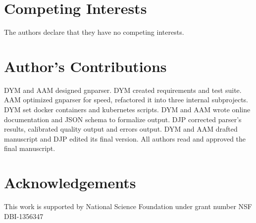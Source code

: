 \documentclass{bmcart}
\begin{document}
\section*{Competing Interests}

The authors declare that they have no competing interests.

\section*{Author's Contributions}

DYM and AAM designed gnparser. DYM created requirements and test suite. AAM
optimized gnparser for speed, refactored it into three internal subprojects.
DYM set docker containers and kubernetes scripts. DYM and AAM wrote online
documentation and JSON schema to formalize output. DJP corrected parser's
results, calibrated quality output and errors output. DYM and AAM drafted
manuscript and DJP edited its final version. All authors read and approved the
final manuscript.

\section*{Acknowledgements}

This work is supported by National Science Foundation under grant number NSF
DBI-1356347



\end{document}
